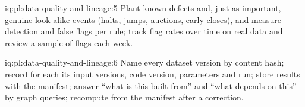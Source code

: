 \begin{solution}{iq:pl:data-quality-and-lineage:5}
Plant known defects and, just as important, genuine look-alike events (halts, jumps, auctions, early closes), and measure detection
and false flags per rule; track flag rates over time on real data and review a sample of flags each week.
\end{solution}

\begin{solution}{iq:pl:data-quality-and-lineage:6}
Name every dataset version by content hash; record for each its input versions, code version, parameters and run; store results with
the manifest; answer ``what is this built from'' and ``what depends on this'' by graph queries; recompute from the manifest after a
correction.
\end{solution}
